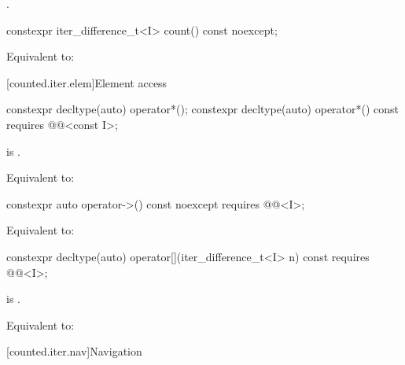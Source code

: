 \begin{itemdescr}
\pnum
\returns
{}.
\end{itemdescr}

%
\begin{itemdecl}
constexpr iter_difference_t<I> count() const noexcept;
\end{itemdecl}

\begin{itemdescr}
\pnum
\effects
Equivalent to: 
\end{itemdescr}

[counted.iter.elem]{Element access}

%
\begin{itemdecl}
constexpr decltype(auto) operator*();
constexpr decltype(auto) operator*() const
  requires @@<const I>;
\end{itemdecl}

\begin{itemdescr}
\pnum
\hardexpects
{} is .

\pnum
\effects
Equivalent to: 
\end{itemdescr}

%
\begin{itemdecl}
constexpr auto operator->() const noexcept
  requires @@<I>;
\end{itemdecl}

\begin{itemdescr}
\pnum
\effects
Equivalent to: 
\end{itemdescr}

%
\begin{itemdecl}
constexpr decltype(auto) operator[](iter_difference_t<I> n) const
  requires @@<I>;
\end{itemdecl}

\begin{itemdescr}
\pnum
\hardexpects
{} is .

\pnum
\effects
Equivalent to: 
\end{itemdescr}

[counted.iter.nav]{Navigation}

